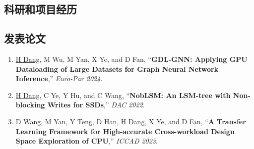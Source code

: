 \documentclass[a4paper,10pt]{ctexart} %
\begin{document}

\begin{keepsection}
\section{科研和项目经历}

\subsection{发表论文}
    \begin{enumerate}
        \item \label{GDL-GNN-Paper} \underline{H Dang}, M Wu, M Yan, X Ye, and D Fan, ``\textbf{GDL-GNN: Applying GPU Dataloading of Large Datasets for Graph Neural Network Inference},'' \textit{Euro-Par 2024}.
        \item \label{NobLSM-Paper} \underline{H Dang}, C Ye, Y Hu, and C Wang, ``\textbf{NobLSM: An LSM-tree with Non-blocking Writes for SSDs},'' \textit{DAC 2022}.
        \item \label{TrEnDSE-Paper} D Wang, M Yan, Y Teng, D Han, \underline{H Dang}, X Ye, and D Fan, ``\textbf{A Transfer Learning Framework for High-accurate Cross-workload Design Space Exploration of CPU},'' \textit{ICCAD 2023}.
    \end{enumerate}
\end{keepsection}
\end{document}

